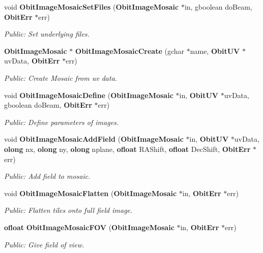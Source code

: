 \begin{CompactItemize}
void {\bf Obit\-Image\-Mosaic\-Set\-Files} ({\bf Obit\-Image\-Mosaic} $\ast$in, gboolean do\-Beam, {\bf Obit\-Err} $\ast$err)
\begin{CompactList}\small\item\em Public: Set underlying files. \item\end{CompactList}\item 
{\bf Obit\-Image\-Mosaic} $\ast$ {\bf Obit\-Image\-Mosaic\-Create} (gchar $\ast$name, {\bf Obit\-UV} $\ast$uv\-Data, {\bf Obit\-Err} $\ast$err)
\begin{CompactList}\small\item\em Public: Create Mosaic from uv data. \item\end{CompactList}\item 
void {\bf Obit\-Image\-Mosaic\-Define} ({\bf Obit\-Image\-Mosaic} $\ast$in, {\bf Obit\-UV} $\ast$uv\-Data, gboolean do\-Beam, {\bf Obit\-Err} $\ast$err)
\begin{CompactList}\small\item\em Public: Define parameters of images. \item\end{CompactList}\item 
void {\bf Obit\-Image\-Mosaic\-Add\-Field} ({\bf Obit\-Image\-Mosaic} $\ast$in, {\bf Obit\-UV} $\ast$uv\-Data, {\bf olong} nx, {\bf olong} ny, {\bf olong} nplane, {\bf ofloat} RAShift, {\bf ofloat} Dec\-Shift, {\bf Obit\-Err} $\ast$err)
\begin{CompactList}\small\item\em Public: Add field to mosaic. \item\end{CompactList}\item 
void {\bf Obit\-Image\-Mosaic\-Flatten} ({\bf Obit\-Image\-Mosaic} $\ast$in, {\bf Obit\-Err} $\ast$err)
\begin{CompactList}\small\item\em Public: Flatten tiles onto full field image. \item\end{CompactList}\item 
{\bf ofloat} {\bf Obit\-Image\-Mosaic\-FOV} ({\bf Obit\-Image\-Mosaic} $\ast$in, {\bf Obit\-Err} $\ast$err)
\begin{CompactList}\small\item\em Public: Give field of view. \item\end{CompactList}\item 

\end{CompactItemize}
